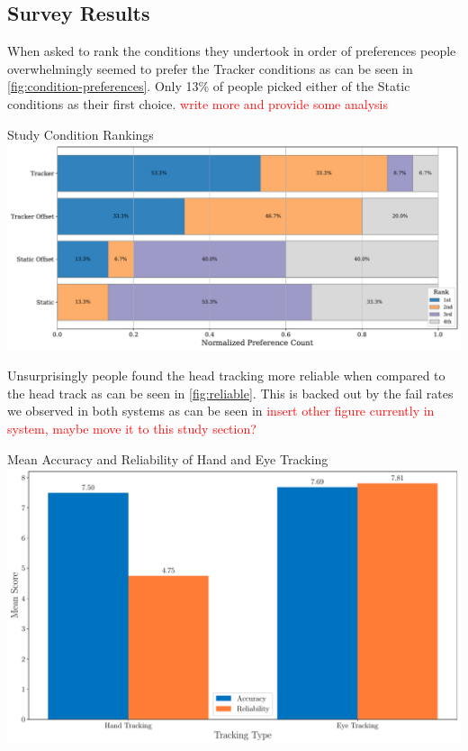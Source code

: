 \subsection{Survey Results}

When asked to rank the conditions they undertook in order of preferences people overwhelmingly seemed to prefer the Tracker conditions as can be seen in \ref{fig:condition-preferences}. Only 13\% of people picked either of the Static conditions as their first choice. \textcolor{red}{write more and provide some analysis} 

\begin{figureBox}[label={fig:condition-preferences}, width=1.0\linewidth]{Study Condition Rankings}
    \includegraphics[width = 1.0\linewidth]{./evaluation/figures/survery/preferences.pdf}
\end{figureBox}

Unsurprisingly people found the head tracking more reliable when compared to the head track as can be seen in \ref{fig:reliable}. This is backed out by the fail rates we observed in both systems as can be seen in \textcolor{red}{insert other figure currently in system, maybe move it to this study section?}

\begin{figureBox}[label={fig:reliable}, width=0.8\linewidth]{Mean Accuracy and Reliability of Hand and Eye Tracking}
    \includegraphics[width = 1.0\linewidth]{./evaluation/figures/survery/reliable-accurate.pdf}
\end{figureBox}


